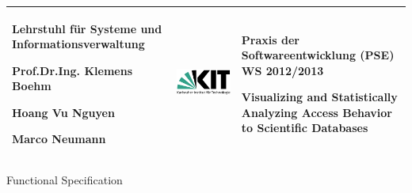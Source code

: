 \begin{titlepage}

\vspace*{-3cm}
\begin{center}

\begin{tabular}{m{5.5cm} m{5cm} m{5.5cm}}
\arrayrulecolor{Bittersweet!90}

\begin{center}
\footnotesize{
\textbf{ Lehrstuhl für Systeme und Informationsverwaltung}
\newline

Prof.Dr.Ing. Klemens Boehm

Hoang Vu Nguyen

Marco Neumann
} 	
\end{center}
   & 
\begin{center}

   \includegraphics[width=0.9\linewidth]{Pictures/KIT-Logo.png}
   
\end{center}   
   & 
\begin{center}
\footnotesize{
\textbf{Praxis der Softwareentwicklung (PSE)}\newline
WS 2012/2013\newline

Visualizing and Statistically Analyzing Access Behavior to Scientific Databases
}
\end{center}\\
\hline
 
\end{tabular}


\vspace*{5cm}

\Huge
Functional Specification

\vspace*{1.5cm}

\normalsize

\begin{center}


\end{center}
\end{center}
\end{titlepage}
